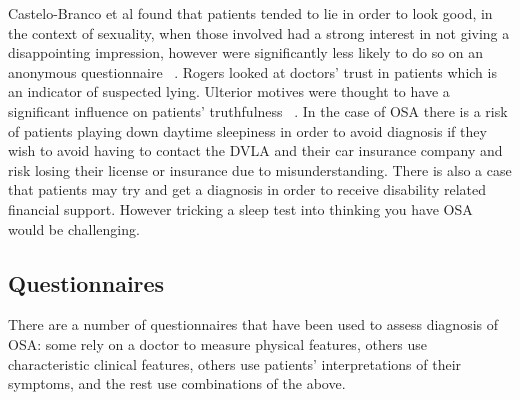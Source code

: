 Castelo-Branco et al found that patients tended to lie in order to look good, in the context of sexuality, when those involved had a strong interest in not giving a disappointing impression, however were significantly less likely to do so on an anonymous questionnaire ~\cite{castelo2010patients}. Rogers looked at doctors’ trust in patients which is an indicator of suspected lying. Ulterior motives were thought to have a significant influence on patients’ truthfulness ~\cite{rogers2002there}. In the case of OSA there is a risk of patients playing down daytime sleepiness in order to avoid diagnosis if they wish to avoid having to contact the DVLA and their car insurance company and risk losing their license or insurance due to misunderstanding. There is also a case that patients may try and get a diagnosis in order to receive disability related financial support. However tricking a sleep test into thinking you have OSA would be challenging. 

\subsection{Questionnaires}
There are a number of questionnaires that have been used to assess diagnosis of OSA: some rely on a doctor to measure physical features, others use characteristic clinical features, others use patients’ interpretations of their symptoms, and the rest use combinations of the above. 

